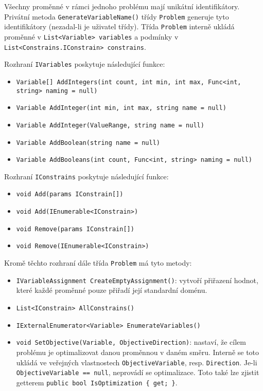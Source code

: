 \documentclass[a4paper]{article}
\begin{document}
Všechny proměnné v rámci jednoho problému mají unikátní identifikátory.
Privátní metoda \texttt{GenerateVariableName()} třídy \texttt{Problem} generuje
tyto identifikátory (nezadal-li je uživatel třídy).
Třída \texttt{Problem} interně ukládá proměnné v \texttt{List<Variable>
variables} a podmínky v \texttt{List<Constrains.IConstrain> constrains}.

Rozhraní \texttt{IVariables} poskytuje následující funkce:
\begin{itemize}
\item \texttt{Variable[] AddIntegers(int count, int min, int max, Func<int,
	string> naming = null)}
\item \texttt{Variable AddInteger(int min, int max, string name = null)}
\item \texttt{Variable AddInteger(ValueRange, string name = null)}
\item \texttt{Variable AddBoolean(string name = null)}
\item \texttt{Variable AddBooleans(int count, Func<int, string> naming = null)}
\end{itemize}

Rozhraní \texttt{IConstrains} poskytuje následující funkce:
\begin{itemize}
\item \texttt{void Add(params IConstrain[])}
\item \texttt{void Add(IEnumerable<IConstrain>)}
\item \texttt{void Remove(params IConstrain[])}
\item \texttt{void Remove(IEnumerable<IConstrain>)}
\end{itemize}

Kromě těchto rozhraní dále třída \texttt{Problem} má tyto metody:
\begin{itemize}
\item \texttt{IVariableAssignment CreateEmptyAssignment()}:
	vytvoří přiřazení hodnot, které každé proměnné pouze přiřadí její
	standardní doménu.
\item \texttt{List<IConstrain> AllConstrains()}
\item \texttt{IExternalEnumerator<Variable> EnumerateVariables()}
\item \texttt{void SetObjective(Variable, ObjectiveDirection)}:
	nastaví, že cílem problému je optimalizovat danou proměnnou v daném
	směru.
	Interně se toto ukládá ve veřejných vlastnostech
	\texttt{ObjectiveVariable}, resp. \texttt{Direction}. Je-li
	\texttt{ObjectiveVariable == null}, neprovádí se optimalizace. Toto také
	lze zjistit getterem \texttt{public bool IsOptimization \{ get; \}}.
\end{itemize}
\end{document}
